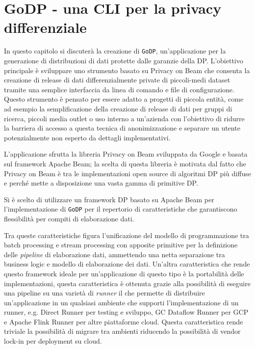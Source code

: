 \chapter{GoDP - una CLI per la privacy differenziale}
In questo capitolo si discuterà la creazione di \texttt{GoDP}, un'applicazione per la generazione di distribuzioni di dati protette dalle garanzie della DP. L'obiettivo principale è sviluppare uno strumento basato su Privacy on Beam che consenta la creazione di release di dati differenzialmente private di piccoli-medi dataset tramite una semplice interfaccia da linea di comando e file di configurazione. Questo strumento è pensato per essere adatto a progetti di piccola entità, come ad esempio la semplificazione della creazione di release di dati per gruppi di ricerca, piccoli media outlet o uso interno a un'azienda con l'obiettivo di ridurre la barriera di accesso a questa tecnica di anonimizzazione e separare un utente potenzialmente non esperto da dettagli implementativi.

L'applicazione sfrutta la libreria Privacy on Beam sviluppata da Google \cite{pbeampac91:online} e basata sul framework Apache Beam; la scelta di questa libreria è motivata dal fatto che Privacy on Beam è tra le implementazioni open source di algoritmi DP più diffuse e perché mette a disposizione una vasta gamma di primitive DP.

Si è scelto di utilizzare un framework DP basato su Apache Beam per l'implementazione di \texttt{GoDP} per il repertorio di caratteristiche che garantiscono flessibilità per compiti di elaborazione dati.

Tra queste caratteristiche figura l'unificazione del modello di programmazione tra batch processing e stream processing con apposite primitive per la definizione delle \textit{pipeline} di elaborazione dati, ammettendo una netta separazione tra business logic e modello di elaborazione dei dati.
Un'altra caratteristica che rende questo framework ideale per un'applicazione di questo tipo è la portabilità delle implementazioni, questa caratteristica è ottenuta grazie alla possibilità di eseguire una pipeline su una varietà di \textit{runner} il che permette di distribuire un'applicazione in un qualsiasi ambiente che supporti l'implementazione di un runner, e.g. Direct Runner per testing e sviluppo, GC Dataflow Runner per GCP e Apache Flink Runner per altre piattaforme cloud. Questa caratteristica rende triviale la possibilità di migrare tra ambienti riducendo la possibilità di vendor lock-in per deployment su cloud.

